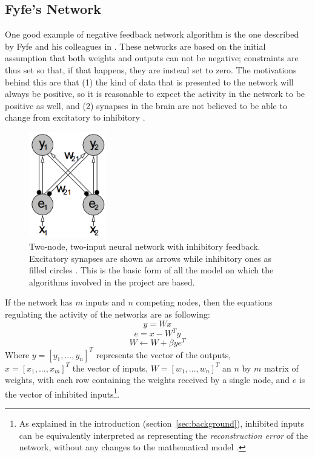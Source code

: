 \documentclass[11pt,a4paper]{report}
\begin{document}
			\subsection{Fyfe's Network}
				One good example of negative feedback network algorithm is the one described by Fyfe and his colleagues in \cite{charles1997discovering,charles1998modelling,charles2002unsupervised,fyfe1997neural}. These networks are based on the initial assumption that both weights and outputs can not be negative; constraints are thus set so that, if that happens, they are instead set to zero. The motivations behind this are that (1) the kind of data that is presented to the network will always be positive, so it is reasonable to expect the activity in the network to be positive as well, and (2) synapses in the brain are not believed to be able to change from excitatory to inhibitory \cite{charles1998modelling}.

				\newpage

				\begin{figure}[h]
					\centering
					\includegraphics[width=0.3\textwidth]{basictopology}
					\caption[Basic model for the network studied in the project.]{Two-node, two-input neural network with inhibitory feedback. Excitatory synapses are shown as arrows while inhibitory ones as filled circles \cite{spratling2009unsupervised}. This is the basic form of all the model on which the algorithms involved in the project are based.}
					\label{fig:basictopology}
				\end{figure}

				If the network has $m$ inputs and $n$ competing nodes, then the equations regulating the activity of the networks are as following:
				\begin{equation}
					y = Wx
				\end{equation}
				\begin{equation}
					e = x - W^Ty
				\end{equation}
				\begin{equation}
					W \leftarrow W + \beta y e^T
				\end{equation}
				Where $y = [y_1, ..., y_n]^T$ represents the vector of the outputs,\\$x = [x_1, ..., x_m]^T$ the vector of inputs, $W = [w_1, ..., w_n]^T$ an $n$ by $m$ matrix of weights, with each row containing the weights received by a single node, and $e$ is the vector of inhibited inputs\footnote{As explained in the introduction (section~\ref{sec:background}), inhibited inputs can be equivalently interpreted as representing the \emph{reconstruction error} of the network, without any changes to the mathematical model \cite{spratling2009unsupervised}.}.
			
\end{document}
